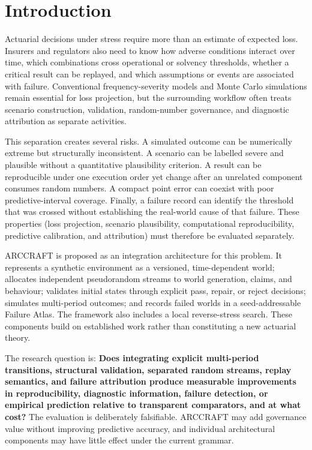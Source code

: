 \section{Introduction}\label{sec:introduction}

Actuarial decisions under stress require more than an estimate of expected loss. Insurers and regulators also need to know how adverse conditions interact over time, which combinations cross operational or solvency thresholds, whether a critical result can be replayed, and which assumptions or events are associated with failure. Conventional frequency-severity models and Monte Carlo simulations remain essential for loss projection, but the surrounding workflow often treats scenario construction, validation, random-number governance, and diagnostic attribution as separate activities.

This separation creates several risks. A simulated outcome can be numerically extreme but structurally inconsistent. A scenario can be labelled severe and plausible without a quantitative plausibility criterion. A result can be reproducible under one execution order yet change after an unrelated component consumes random numbers. A compact point error can coexist with poor predictive-interval coverage. Finally, a failure record can identify the threshold that was crossed without establishing the real-world cause of that failure. These properties (loss projection, scenario plausibility, computational reproducibility, predictive calibration, and attribution) must therefore be evaluated separately.

ARCCRAFT is proposed as an integration architecture for this problem. It represents a synthetic environment as a versioned, time-dependent world; allocates independent pseudorandom streams to world generation, claims, and behaviour; validates initial states through explicit pass, repair, or reject decisions; simulates multi-period outcomes; and records failed worlds in a seed-addressable Failure Atlas. The framework also includes a local reverse-stress search. These components build on established work rather than constituting a new actuarial theory.

The research question is: \textbf{Does integrating explicit multi-period transitions, structural validation, separated random streams, replay semantics, and failure attribution produce measurable improvements in reproducibility, diagnostic information, failure detection, or empirical prediction relative to transparent comparators, and at what cost?} The evaluation is deliberately falsifiable. ARCCRAFT may add governance value without improving predictive accuracy, and individual architectural components may have little effect under the current grammar.

